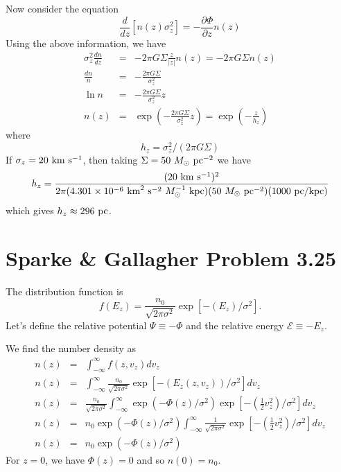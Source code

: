\documentclass[]{article}
\begin{document}
\noindent
Now consider the equation
\begin{equation}
\frac{d}{dz}[n(z)\sigma_z^2] = - \frac{\partial \Phi}{\partial z} n(z)
\end{equation}
\noindent
Using the above information, we have
\begin{eqnarray}
\sigma_z^2 \frac{dn}{dz} &=& -2\pi G \Sigma \frac{z}{|z|} n(z) = -2\pi G \Sigma n(z)\\
\frac{dn}{n} &=& -\frac{2\pi G\Sigma}{\sigma_z^2}\\
\ln n &=& -\frac{2\pi G\Sigma}{\sigma_z^2} z\\
n(z) &=& \exp\left(-\frac{2\pi G\Sigma}{\sigma_z^2} z \right) = \exp\left(- \frac{z}{h_z}\right)
\end{eqnarray}
\noindent
where
\begin{equation}
h_z = \sigma_z^2 / (2\pi G \Sigma)
\end{equation}
\noindent
If $\sigma_z = 20~\mathrm{km}~\mathrm{s}^{-1}$, then taking $\Sigma = 50~M_{\odot}~\mathrm{pc}^{-2}$ we have
\begin{equation}
h_z = \frac{(20~\mathrm{km}~\mathrm{s}^{-1})^2}{2\pi(4.301\times10^{-6}~\mathrm{km}^2~\mathrm{s}^{-2}~M_{\odot}^{-1}~\mathrm{kpc})(50~M_{\odot}~\mathrm{pc}^{-2})(1000~\mathrm{pc}/\mathrm{kpc})}
\end{equation}
\noindent
which gives $h_z \approx 296~\mathrm{pc}$.


\section{Sparke \& Gallagher Problem 3.25}
The distribution function is
\begin{equation}
f(E_z) = \frac{n_0}{\sqrt{2\pi\sigma^2}}\exp\left[-\left(E_z\right)/\sigma^2\right].
\end{equation}
\noindent
Let's define the relative potential $\Psi\equiv -\Phi$ and the
relative energy $\mathcal{E} \equiv -E_z$.

We find the number density as
\begin{eqnarray}
n(z) &=& \int_{-\infty}^{\infty} f(z,v_z) dv_z\\
n(z) &=& \int_{-\infty}^{\infty} \frac{n_0}{\sqrt{2\pi\sigma^2}}\exp\left[-\left(E_z(z,v_z)\right)/\sigma^2\right] dv_z\\
n(z)&=&\frac{n_0}{\sqrt{2\pi\sigma^2}}\int_{-\infty}^{\infty}  \exp(-\Phi(z)/\sigma^2)\exp\left[-\left(\frac{1}{2}v_z^2\right)/\sigma^2\right]dv_z\\
n(z)&=&n_0\exp(-\Phi(z)/\sigma^2)\int_{-\infty}^{\infty} \frac{1}{\sqrt{2\pi\sigma^2}} \exp\left[-\left(\frac{1}{2}v_z^2\right)/\sigma^2\right]dv_z\\
n(z)&=&n_0\exp(-\Phi(z)/\sigma^2)
\end{eqnarray}
For $z=0$, we have $\Phi(z) = 0$ and
so $n(0) = n_0$.
\end{document}
